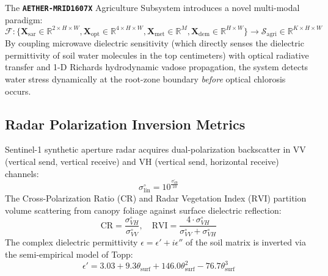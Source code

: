 \documentclass[11pt,a4paper]{article}
\theoremstyle{definition}
\theoremstyle{remark}
\begin{document}
\noindent
The \textbf{\texttt{AETHER-MRID1607X}} Agriculture Subsystem introduces a novel multi-modal paradigm:
\begin{equation}
    \mathcal{F}: \{\mathbf{X}_{\text{sar}} \in \mathbb{R}^{2 \times H \times W}, \mathbf{X}_{\text{opt}} \in \mathbb{R}^{4 \times H \times W}, \mathbf{X}_{\text{met}} \in \mathbb{R}^{M}, \mathbf{X}_{\text{dem}} \in \mathbb{R}^{H \times W}\} \longrightarrow \mathcal{S}_{\text{agri}} \in \mathbb{R}^{K \times H \times W}
\end{equation}
By coupling microwave dielectric sensitivity (which directly senses the dielectric permittivity of soil water molecules in the top centimeters) with optical radiative transfer and 1-D Richards hydrodynamic vadose propagation, the system detects water stress dynamically at the root-zone boundary \textit{before} optical chlorosis occurs.

\subsection{Radar Polarization Inversion Metrics}
Sentinel-1 synthetic aperture radar acquires dual-polarization backscatter in VV (vertical send, vertical receive) and VH (vertical send, horizontal receive) channels:
\begin{equation}
    \sigma^\circ_{\text{lin}} = 10^{\frac{\sigma^\circ_{\text{dB}}}{10}}
\end{equation}
The Cross-Polarization Ratio ($\text{CR}$) and Radar Vegetation Index ($\text{RVI}$) partition volume scattering from canopy foliage against surface dielectric reflection:
\begin{equation}
    \text{CR} = \frac{\sigma^\circ_{VH}}{\sigma^\circ_{VV}}, \quad \text{RVI} = \frac{4 \cdot \sigma^\circ_{VH}}{\sigma^\circ_{VV} + \sigma^\circ_{VH}}
\end{equation}
The complex dielectric permittivity $\epsilon = \epsilon' + i \epsilon''$ of the soil matrix is inverted via the semi-empirical model of Topp:
\begin{equation}
    \epsilon' = 3.03 + 9.3 \theta_{\text{surf}} + 146.0 \theta_{\text{surf}}^2 - 76.7 \theta_{\text{surf}}^3
\end{equation}
\end{document}
